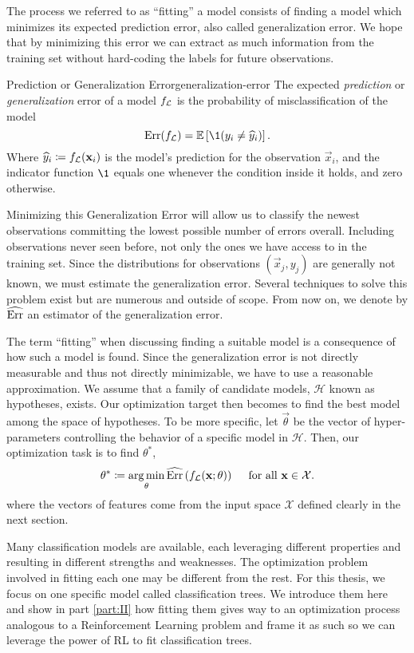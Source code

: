 The process we referred to as ``fitting'' a model consists of finding a model
which minimizes its expected prediction error, also called generalization error.
We hope that by minimizing this error we can extract as much information from
the training set without hard-coding the labels for future observations.

\begin{dfn}{Prediction or Generalization Error}{generalization-error}
    The expected \emph{prediction} or \emph{generalization} error of a model
    $f_{\mathcal{L}}$ is the probability of misclassification of the model
    \[
        \Err (f_\L) = \mathbb{E} \left[ \1 (y_i \neq \widehat{y}_i)  \right].
    \]
    Where $\widehat{y}_i \coloneqq f_{\mathcal{L}} (\mathbf{x}_i)$ is the model's prediction
    for the observation $\vec{x}_i$, and the indicator function $\1$ equals one
    whenever the condition inside it holds, and zero otherwise.
\end{dfn}

Minimizing this Generalization Error will allow us to classify the newest
observations committing the lowest possible number of errors overall.
Including observations never seen before, not only the ones we have access to in
the training set. Since the distributions for observations $(\vec{x}_j, y_j)$
are generally not known, we must estimate the generalization error. Several
techniques to solve this problem exist but are numerous and outside of scope.
From now on, we denote by $\widehat{\operatorname*{Err}}$ an estimator of the generalization
error.

The term ``fitting'' when discussing finding a suitable model is a consequence
of how such a model is found. Since the generalization error is not directly
measurable and thus not directly minimizable, we have to use a reasonable
approximation. We assume that a family of candidate models, $\mathcal{H}$ known
as hypotheses, exists. Our optimization target then becomes to find the best
model among the space of hypotheses. To be more specific, let $\vec{\theta}$ be
the vector of hyper-parameters controlling the behavior of a specific model in
$\mathcal{H}$.  Then, our optimization task is to find $\theta^{*}$,
\[
    \theta^{*} \coloneqq \operatorname*{arg\,min}_{\theta} \widehat{\operatorname*{Err}}\left(f_{\mathcal{L}} (\mathbf{x}; \theta) \right) \quad \text{ for all } \mathbf{x} \in \mathcal{X}.
\]
where the vectors of features come from the input space $\mathcal{X}$ defined
clearly in the next section.

Many classification models are available, each leveraging different properties
and resulting in different strengths and weaknesses. The optimization problem
involved in fitting each one may be different from the rest. For this thesis, we
focus on one specific model called classification trees. We introduce them here
and show in part \ref{part:II} how fitting them gives way to an optimization
process analogous to a Reinforcement Learning problem and frame it as such so we
can leverage the power of RL to fit classification trees.

